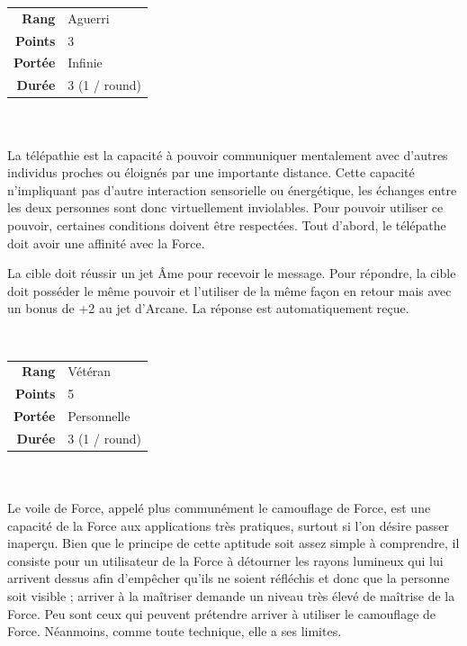 \begin{description}[align=left]
        \begin{tabular}{ r l }
            \textbf{Rang}    & Aguerri \\
            \textbf{Points}  & 3 \\
            \textbf{Portée}  & Infinie \\
            \textbf{Durée}   & 3 (1 / round) \\
        \end{tabular}
        \\ \\
        La télépathie est la capacité à pouvoir communiquer mentalement avec d'autres individus proches ou éloignés par une importante distance. Cette capacité n'impliquant pas d'autre interaction sensorielle ou énergétique, les échanges entre les deux personnes sont donc virtuellement inviolables. Pour pouvoir utiliser ce pouvoir, certaines conditions doivent être respectées. Tout d'abord, le télépathe doit avoir une affinité avec la Force. 

        La cible doit réussir un jet \^Ame pour recevoir le message. Pour répondre, la cible doit posséder le même pouvoir et l'utiliser de la même façon en retour mais avec un bonus de +2 au jet d'Arcane. La réponse est automatiquement reçue.
        \\

    \item [Voile de Force] ~ \\

        \begin{tabular}{ r l }
            \textbf{Rang}    & Vétéran \\
            \textbf{Points}  & 5 \\
            \textbf{Portée}  & Personnelle \\
            \textbf{Durée}   & 3 (1 / round) \\
        \end{tabular}
        \\ \\
        Le voile de Force, appelé plus communément le camouflage de Force, est une capacité de la Force aux applications très pratiques, surtout si l'on désire passer inaperçu. Bien que le principe de cette aptitude soit assez simple à comprendre, il consiste pour un utilisateur de la Force à détourner les rayons lumineux qui lui arrivent dessus afin d'empêcher qu'ils ne soient réfléchis et donc que la personne soit visible ; arriver à la maîtriser demande un niveau très élevé de maîtrise de la Force. Peu sont ceux qui peuvent prétendre arriver à utiliser le camouflage de Force. Néanmoins, comme toute technique, elle a ses limites.


\end{description}
